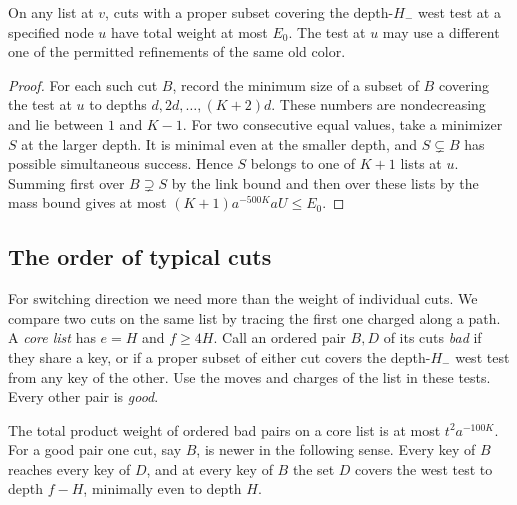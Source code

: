 \begin{lemma}\label{lem:proper-loss}
On any list at $v$, cuts with a proper subset covering the depth-$H_-$
west test at a specified node $u$ have total weight at most $E_0$.
The test at $u$ may use a different one of the permitted refinements
of the same old color.
\end{lemma}

\begin{proof}
For each such cut $B$, record the minimum size of a subset of $B$
covering the test at $u$ to depths $d,2d,\ldots,(K+2)d$. These numbers
are nondecreasing and lie between $1$ and $K-1$. For two consecutive
equal values, take a minimizer $S$ at the larger depth. It is minimal
even at the smaller depth, and $S\subsetneq B$ has possible simultaneous
success. Hence $S$ belongs to one of $K+1$ lists at $u$. Summing first
over $B\supsetneq S$ by the link bound and then over these lists by the
mass bound gives at most $(K+1)a^{-500K}aU\le E_0$.
\end{proof}

\subsection{The order of typical cuts}

For switching direction we need more than the weight of individual
cuts. We compare two cuts on the same list by tracing the first one
charged along a path. A \emph{core list} has \(e=H\) and \(f\ge4H\).
Call an ordered pair \(B,D\) of its cuts \emph{bad} if they share a
key, or if a proper subset of either cut covers the depth-\(H_-\)
west test from any key of the other. Use the moves and charges of the
list in these tests. Every other pair is \emph{good}.

\begin{lemma}\label{lem:good-comparisons}
The total product weight of ordered bad pairs on a core list is at most
$t^2 a^{-100K}$. For a good pair one cut, say $B$, is newer in the
following sense. Every key of $B$ reaches every key of $D$, and at every
key of $B$ the set $D$ covers the west test to depth $f-H$, minimally
even to depth $H$.
\end{lemma}

